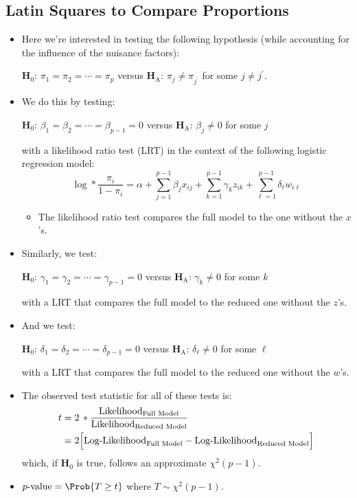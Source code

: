 \subsection{Latin Squares to Compare Proportions}
\begin{itemize}
    \item Here we're interested in testing the following hypothesis (while accounting for the influence of the
          nuisance factors):
          \begin{tightcenter}
              $ \mathbf{H}_0 $: $ \pi_1=\pi_2=\cdots=\pi_p $ versus $ \mathbf{H}_\text{A} $: $ \pi_j\ne \pi_{j^\prime }$ for some $ j\ne j^\prime $.
          \end{tightcenter}
    \item We do this by testing:
          \begin{tightcenter}
              $ \mathbf{H}_0 $: $ \beta_1=\beta_2=\cdots=\beta_{p-1}=0 $ versus $ \mathbf{H}_\text{A} $: $ \beta_j\ne 0$ for some $ j $
          \end{tightcenter}
          with a likelihood ratio test (LRT) in the context of the following logistic regression model:
          \[ \log*{\frac{\pi_i}{1-\pi_i}}=\alpha+\sum_{j=1}^{p-1} \beta_j x_{ij}+\sum_{k=1}^{p-1} \gamma_k z_{ik}+\sum_{\ell=1}^{p-1} \delta_\ell w_{i\ell} \]
          \begin{itemize}
              \item The likelihood ratio test compares the full model to the one without the $ x $'s.
          \end{itemize}
    \item Similarly, we test:
          \begin{tightcenter}
              $ \mathbf{H}_0 $: $ \gamma_1=\gamma_2=\cdots=\gamma_{p-1}=0 $ versus $ \mathbf{H}_\text{A} $: $ \gamma_k\ne 0$ for some $ k $
          \end{tightcenter}
          with a LRT that compares the full model to the reduced one without the $ z $'s.
    \item And we test:
          \begin{tightcenter}
              $ \mathbf{H}_0 $: $ \delta_1=\delta_2=\cdots=\delta_{p-1}=0 $ versus $ \mathbf{H}_\text{A} $: $ \delta_\ell\ne 0$ for some $ \ell $
          \end{tightcenter}
          with a LRT that compares the full model to the reduced one without the $ w $'s.
    \item The observed test statistic for all of these tests is:
          \begin{align*}
              t & =2\,\log*{\frac{\text{Likelihood}_{\text{Full Model}}}{\text{Likelihood}_{\text{Reduced Model}}}}    \\
                & =2\Bigl[\text{Log-Likelihood}_{\text{Full Model}}-\text{Log-Likelihood}_{\text{Reduced Model}}\Bigr]
          \end{align*}
          which, if $ \mathbf{H}_0 $ is true, follows an approximate $ \chi^2(p-1) $.
    \item $ p\text{-value}=\Prob{T\ge t} $ where $ T \sim \chi^2(p-1) $.
\end{itemize}
